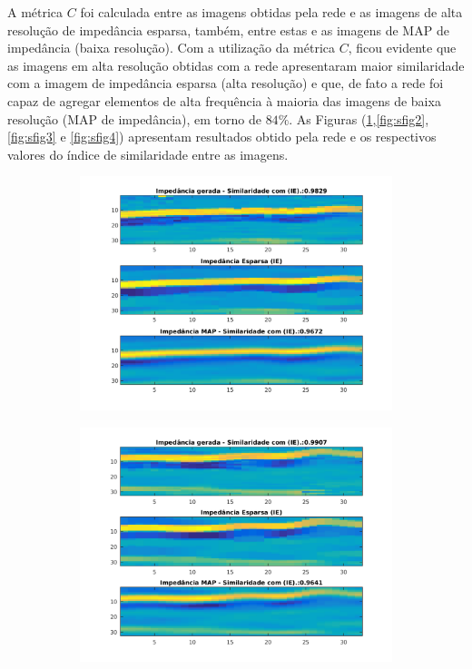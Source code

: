 \documentclass[11pt]{article}
\begin{document}
A métrica $C$ foi calculada entre as imagens obtidas pela rede e as imagens de alta resolução de impedância esparsa, também, entre estas e
as imagens de MAP de impedância (baixa resolução). Com a utilização da métrica $C$, ficou evidente que as imagens em alta resolução obtidas com a rede apresentaram
maior similaridade com a imagem de impedância esparsa (alta resolução) e que, de fato a rede foi capaz de agregar elementos de
alta frequência à maioria das imagens de baixa resolução (MAP de impedância), em torno de $84\%$. As Figuras (\ref{fig:sfig1},\ref{fig:sfig2},\ref{fig:sfig3} e \ref{fig:sfig4})
apresentam resultados obtido pela rede e os respectivos valores do índice de similaridade entre as imagens.
\begin{figure}[htp]
\begin{subfigure}{.5\textwidth}
  \centering
  \includegraphics[width=.9\linewidth]{fig/7}
  \caption{}
  \label{fig:sfig1}
\end{subfigure}%
\begin{subfigure}{.5\textwidth}
  \centering
  \includegraphics[width=.9\linewidth]{fig/5}

\end{subfigure}
\end{figure}
\end{document}
